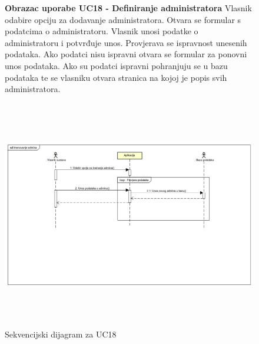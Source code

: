 			
				\begin{figure}[H]
					\textbf{Obrazac uporabe UC18 - Definiranje administratora} 
					\newline
					\newline
					Vlasnik odabire opciju za dodavanje administratora. Otvara se formular s podatcima o administratoru. Vlasnik unosi podatke o administratoru i potvrđuje unos. Provjerava se ispravnost unesenih podataka. Ako podatci nisu ispravni otvara se formular za ponovni unos podataka. Ako su podatci ispravni pohranjuju se u bazu podataka te se vlasniku otvara stranica na kojoj je popis svih administratora. \par
					\includegraphics[width=170mm,height=100mm]{slike/Imenovanje_admina.png} 
					\newline
					\centering
					\caption{Sekvencijski dijagram za UC18}
					\label{fig:promjene}
				\end{figure}
			
